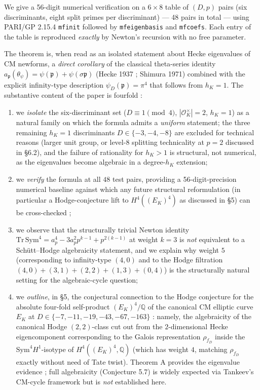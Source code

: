 \documentclass[
  11pt,
  a4paper,
]{amsart}
\begin{document}
We give a 56-digit numerical verification on a \(6 \times 8\) table of \((D, p)\) pairs (six discriminants, eight split primes per discriminant) --- 48 pairs in total --- using PARI/GP 2.15.4 \texttt{mfinit} followed by \texttt{mfeigenbasis} and \texttt{mfcoefs}. Each entry of the table is reproduced \emph{exactly} by Newton's recursion with no free parameter.

The theorem is, when read as an isolated statement about Hecke eigenvalues of CM newforms, a \emph{direct corollary} of the classical theta-series identity \(a_\mathfrak{p}(\theta_\psi) = \psi(\mathfrak{p}) + \psi(\sigma\mathfrak{p})\) (Hecke 1937 ; Shimura 1971) combined with the explicit infinity-type description \(\psi_D(\mathfrak{p}) = \pi^4\) that follows from \(h_K = 1\). The substantive content of the paper is fourfold :

\begin{enumerate}
\def\labelenumi{(\roman{enumi})}
\item
  we \emph{isolate} the six-discriminant set (\(D \equiv 1 \pmod 4\), \(|\mathcal{O}_K^\times| = 2\), \(h_K = 1\)) as a natural family on which the formula admits a \emph{uniform} statement; the three remaining \(h_K = 1\) discriminants \(D \in \{-3, -4, -8\}\) are excluded for technical reasons (larger unit group, or level-\(8\) splitting technicality at \(p=2\) discussed in \S 6.2), and the failure of rationality for \(h_K > 1\) is structural, not numerical, as the eigenvalues become algebraic in a degree-\(h_K\) extension;
\item
  we \emph{verify} the formula at all \(48\) test pairs, providing a 56-digit-precision numerical baseline against which any future structural reformulation (in particular a Hodge-conjecture lift to \(H^4((E_K)^4)\) as discussed in §5) can be cross-checked ;
\item
  we observe that the structurally trivial Newton identity \(\mathrm{Tr\,Sym}^4 = a_p^4 - 3 a_p^2 p^{k-1} + p^{2(k-1)}\) at weight \(k = 3\) is \emph{not} equivalent to a Schütt--Hodge algebraicity statement, and we explain why weight \(5\) (corresponding to infinity-type \((4, 0)\) and to the Hodge filtration \((4, 0) + (3, 1) + (2, 2) + (1, 3) + (0, 4)\)) is the structurally natural setting for the algebraic-cycle question;
\item
  we \emph{outline}, in §5, the conjectural connection to the Hodge conjecture for the absolute four-fold self-product \((E_K)^4 / \mathbb{Q}\) of the canonical CM elliptic curve \(E_K\) at \(D \in \{-7, -11, -19, -43, -67, -163\}\) : namely, the algebraicity of the canonical Hodge \((2, 2)\)-class cut out from the \(2\)-dimensional Hecke eigencomponent corresponding to the Galois representation \(\rho_{f_D}\) inside the \(\mathrm{Sym}^4 H^1\)-isotype of \(H^4((E_K)^4, \mathbb{Q})\) (which has weight \(4\), matching \(\rho_{f_D}\) exactly without need of Tate twist). Theorem A provides the eigenvalue evidence ; full algebraicity (Conjecture 5.7) is widely expected via Tankeev's CM-cycle framework but is \emph{not} established here.
\end{enumerate}
\end{document}
